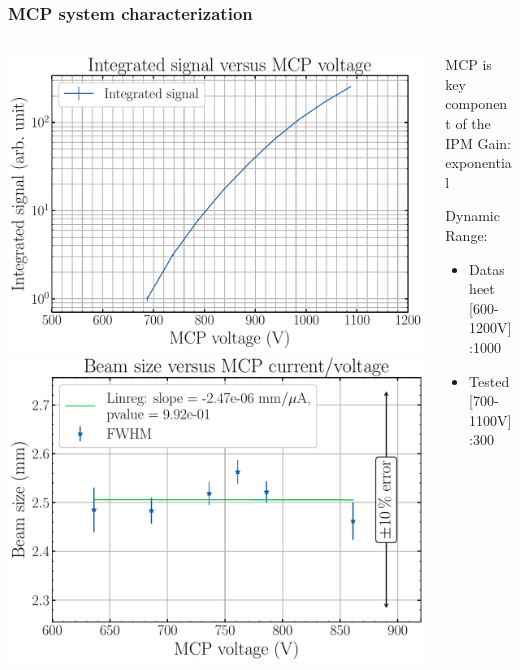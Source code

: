 \begin{frame}[t]
  \frametitle{MCP system characterization}
  \begin{columns}[]
    \begin{column}{0.45\textwidth}
      \includegraphics[width=1\textwidth]{04_Test/fig/fig000_MCP_gain_a}
      \includegraphics[width=1\textwidth]{04_Test/fig/fig000_MCP_gain_b}
    \end{column}

    \begin{column}{0.45\textwidth}
      \begin{block}{MCP is key component of the IPM}
        Gain: exponential

        Dynamic Range:
        \begin{itemize}
          \item Datasheet [600-1200V]:1000
          \item Tested [700-1100V]:300
        \end{itemize}


\end{block}
\end{column}
\end{columns}
\end{frame}
